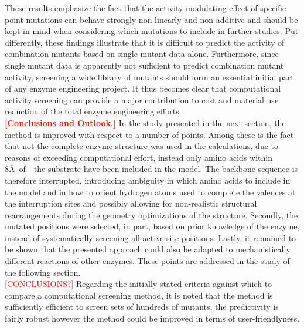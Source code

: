 These results emphasize the fact that the activity modulating effect of specific point mutations can behave strongly non-linearly and non-additive and should be kept in mind when considering which mutations to include in further studies.
Put differently, these findings illustrate that it is difficult to predict the activity of combination mutants based on single mutant data alone.
Furthermore, since single mutant data is apparently not sufficient to predict combination mutant activity, screening a wide library of mutants should form an essential initial part of any enzyme engineering project.
It thus becomes clear that computational activity screening can provide a major contribution to cost and material use reduction of the total enzyme engineering efforts.\\
\textcolor{red}{\textbf{[Conclusions and Outlook.]}}
In the study presented in the next section, the method is improved with respect to a number of points.
Among these is the fact that not the complete enzyme structure was used in the calculations, due to reasons of exceeding computational effort, instead only amino acids within 8\AA \mbox{ of } the substrate have been included in the model.
The backbone sequence is therefore interrupted, introducing ambiguity in which amino acids to include in the model and in how to orient hydrogen atoms used to complete the valences at the interruption sites and possibly allowing for non-realistic structural rearrangements during the geometry optimizations of the structure.
Secondly, the mutated positions were selected, in part, based on prior knowledge of the enzyme, instead of systematically screening all active site positions.
Lastly, it remained to be shown that the presented approach could also be adapted to mechanistically different reactions of other enzymes.
These points are addressed in the study of the following section.\\
\textcolor{red}{[CONCLUSIONS?]}
Regarding the initially stated criteria against which to compare a computational screening method, it is noted that the method is sufficiently efficient to screen sets of hundreds of mutants, the predictivity is fairly robust however the method could be improved in terms of user-friendlyness.

